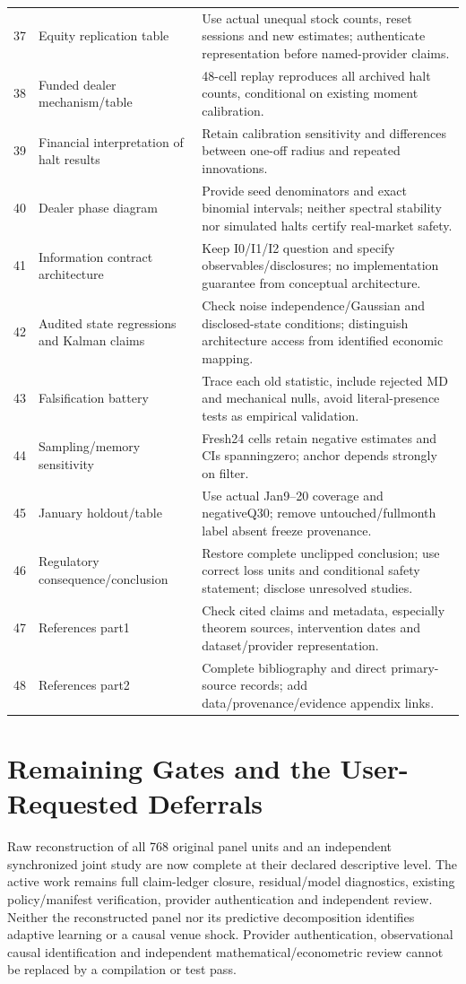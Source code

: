 \begin{longtable}{rp{}p{}}
37 & Equity replication table & Use actual unequal stock counts, reset sessions and new estimates; authenticate representation before named-provider claims.\\
38 & Funded dealer mechanism/\allowbreak table & 48-cell replay reproduces all archived halt counts, conditional on existing moment calibration.\\
39 & Financial interpretation of halt results & Retain calibration sensitivity and differences between one-off radius and repeated innovations.\\
40 & Dealer phase diagram & Provide seed denominators and exact binomial intervals; neither spectral stability nor simulated halts certify real-market safety.\\
41 & Information contract architecture & Keep I0/I1/I2 question and specify observables/disclosures; no implementation guarantee from conceptual architecture.\\
42 & Audited state regressions and Kalman claims & Check noise independence/Gaussian and disclosed-state conditions; distinguish architecture access from identified economic mapping.\\
43 & Falsification battery & Trace each old statistic, include rejected MD and mechanical nulls, avoid literal-presence tests as empirical validation.\\
44 & Sampling/\allowbreak memory sensitivity & Fresh24 cells retain negative estimates and CIs spanningzero; anchor depends strongly on filter.\\
45 & January holdout/\allowbreak table & Use actual Jan9–20 coverage and negativeQ30; remove untouched/fullmonth label absent freeze provenance.\\
46 & Regulatory consequence/\allowbreak conclusion & Restore complete unclipped conclusion; use correct loss units and conditional safety statement; disclose unresolved studies.\\
47 & References part1 & Check cited claims and metadata, especially theorem sources, intervention dates and dataset/provider representation.\\
48 & References part2 & Complete bibliography and direct primary-source records; add data/provenance/evidence appendix links.\\
\end{longtable}
\section{Remaining Gates and the User-Requested Deferrals}
Raw reconstruction of all 768 original panel units and an independent synchronized joint study are now complete at their declared descriptive level. The active work remains full claim-ledger closure, residual/model diagnostics, existing policy/manifest verification, provider authentication and independent review. Neither the reconstructed panel nor its predictive decomposition identifies adaptive learning or a causal venue shock. Provider authentication, observational causal identification and independent mathematical/econometric review cannot be replaced by a compilation or test pass.

